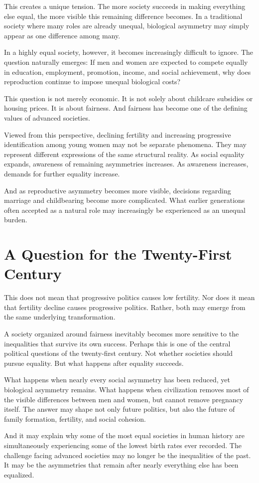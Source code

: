 \documentclass[12pt]{article}
\begin{document}
This creates a unique tension. The more society succeeds in making everything else equal, the more visible this remaining difference becomes. In a traditional society where many roles are already unequal, biological asymmetry may simply appear as one difference among many.

In a highly equal society, however, it becomes increasingly difficult to ignore.
The question naturally emerges: If men and women are expected to compete equally in education, employment, promotion, income, and social achievement, why does reproduction continue to impose unequal biological costs?

This question is not merely economic. It is not solely about childcare subsidies or housing prices. It is about fairness. And fairness has become one of the defining values of advanced societies.

Viewed from this perspective, declining fertility and increasing progressive identification among young women may not be separate phenomena. They may represent different expressions of the same structural reality. As social equality expands, awareness of remaining asymmetries increases. As awareness increases, demands for further equality increase.

And as reproductive asymmetry becomes more visible, decisions regarding marriage and childbearing become more complicated. What earlier generations often accepted as a natural role may increasingly be experienced as an unequal burden.

\section*{A Question for the Twenty-First Century}

This does not mean that progressive politics causes low fertility. Nor does it mean that fertility decline causes progressive politics. Rather, both may emerge from the same underlying transformation.

A society organized around fairness inevitably becomes more sensitive to the inequalities that survive its own success. Perhaps this is one of the central political questions of the twenty-first century. Not whether societies should pursue equality. But what happens after equality succeeds.

What happens when nearly every social asymmetry has been reduced, yet biological asymmetry remains. What happens when civilization removes most of the visible differences between men and women, but cannot remove pregnancy itself. The answer may shape not only future politics, but also the future of family formation, fertility, and social cohesion.

And it may explain why some of the most equal societies in human history are simultaneously experiencing some of the lowest birth rates ever recorded. The challenge facing advanced societies may no longer be the inequalities of the past. It may be the asymmetries that remain after nearly everything else has been equalized.
\end{document}
